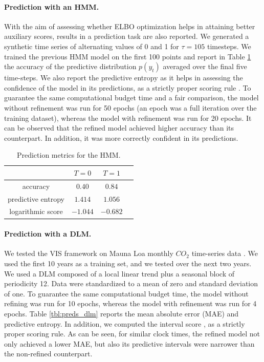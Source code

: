 \paragraph{Prediction with an HMM.} 
With the aim of assessing whether ELBO optimization helps in attaining better auxiliary scores, results in a prediction task are also reported. We generated a synthetic time series of alternating values of 0 and 1 for $\tau=105$ timesteps. We trained the previous HMM model on the first 100 points and report in Table \ref{tbl:preds} the accuracy of the predictive distribution $p(y_t)$ averaged over the final five time-steps. We also report the predictive entropy as it helps in assessing the confidence of the model in its predictions, as a strictly proper scoring rule \parencite{gneiting2007strictly}. To guarantee the same computational budget time and a fair comparison, the model without refinement was run for 50 epochs (an epoch was a full iteration over the training dataset), whereas the model with refinement was run for 20 epochs. It can be observed that the refined model achieved higher accuracy than its counterpart. In addition,
it was more correctly confident in its predictions.
\begin{table}[!h]

\caption{Prediction metrics for the HMM.}\label{tbl:preds}
\begin{tabular}{c@{\hskip 1.2in}c@{\hskip 1.1in}c@{\hskip 1in}c}
\toprule
   & ${T=0}$                             & ${T=1}$   \\ 
 \midrule
    accuracy          & $0.40$ &  $0.84$ \\
    predictive entropy          & $1.414$ &  $1.056$ \\
    logarithmic score   & $-1.044$ & $-0.682$ \\
 \bottomrule
\end{tabular}
\end{table}

\paragraph{Prediction with a DLM.}

We tested the VIS framework on Mauna Loa monthly $CO_2$ time-series data \parencite{keeling2005atmospheric}. We used the first 10 years as a training set, and we tested over the next two years. We used a DLM composed of a local linear trend plus a seasonal block of periodicity 12. %
Data were standardized %
to {a mean of zero and standard deviation of one}. To guarantee the same computational budget time, the model without refining was run for 10 epochs, whereas the model with refinement was run for 4 epochs.  Table \ref{tbl:preds_dlm}
reports the mean absolute error (MAE) and predictive entropy. 
In addition, we computed the interval score 
 \parencite{gneiting2007strictly}, as a strictly proper scoring rule. As can be seen, for similar clock times, the refined model not only achieved a lower MAE, but also its predictive intervals were narrower than the non-refined counterpart. 

